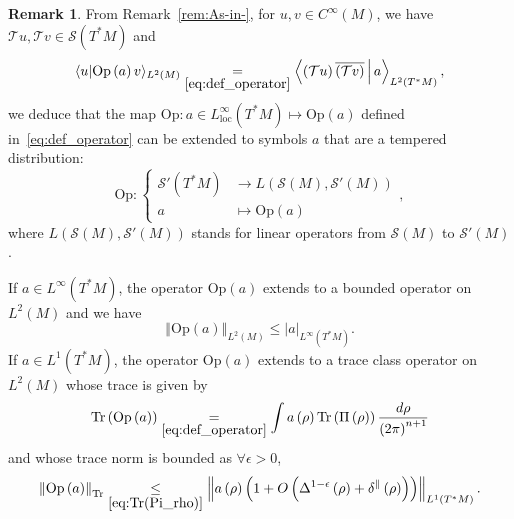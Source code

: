 \documentclass[10pt]{amsart}
\theoremstyle{definition}\newtheorem{defi}[theo]{Definition}\newtheorem{rema}[theo]{Remark}\newtheorem{exam}[theo]{Example}\newtheorem{exem}[theo]{Example}\newtheorem{nota}[theo]{Notation}
\newcommand{\clS}{\mathcal{S}}
\newcommand{\clT}{\mathcal{T}}
\newcommand{\Opp}{\mathrm{Op}}
\newcommand{\Tr}{\mathrm{Tr}}
\newcommand{\locc}{\mathrm{loc}}
\let\oldforall\forall
\renewcommand*{\forall}{\mathrel{\oldforall}}
\begin{document}
\begin{rema}
From Remark~\ref{rem:As-in-}, for $u,v\in C^{\infty}(M)$, we have $\clT u,\clT v\in\clS(T^{*}M)$ and
\[
\langle u|\Opp\left(a\right)v\rangle_{L^{2}\left(M\right)}\underset{\eqref{eq:def_operator}}{=}\left\langle\left(\clT u\right)\overline{\left(\clT v\right)}\,\middle|\,a\right\rangle_{L^{2}\left(T^{*}M\right)},
\]
we deduce that the map $\Opp:a\in L_{\locc}^{\infty}(T^{*}M)\mapsto\Opp(a)$ defined in~\eqref{eq:def_operator} can be extended to symbols $a$ that are a tempered distribution:
\[
\Opp:
\begin{cases}
\clS'\left(T^{*}M\right) & \rightarrow L\left(\clS\left(M\right),\clS'\left(M\right)\right)\\
a & \mapsto\Opp\left(a\right)
\end{cases},
\]
where $L(\clS(M),\clS'(M))$ stands for linear operators from $\clS(M)$ to $\clS'(M)$.
\end{rema}

\begin{cBoxB}{}
\begin{prop}\label{prop:We-havewhere-}
If $a\in L^{\infty}(T^{*}M)$, the operator $\Opp(a)$ extends to a bounded operator on $L^{2}(M)$ and we have
\begin{equation}
\left\Vert \Opp \left(a\right)\right\Vert _{L^{2}\left(M\right)}\underset{}{\leq}\left|a\right|_{L^{\infty}\left(T^{*}M\right)}.\label{eq:norme_symbol}
\end{equation}
If $a\in L^{1}(T^{*}M)$, the operator $\Opp (a)$ extends to a trace class operator on $L^{2}(M)$ whose trace is given by
\begin{equation}
\Tr\left(\Opp \left(a\right)\right)\underset{\eqref{eq:def_operator}}{=}\int a\left(\rho\right)\Tr\left(\Pi\left(\rho\right)\right)\frac{d\rho}{\left(2\pi\right)^{n+1}}\label{eq:Tr_Opa}
\end{equation}
and whose trace norm is bounded as $\forall\epsilon>0$,
\begin{equation}
\left\Vert \Opp \left(a\right)\right\Vert _{\Tr}\underset{\eqref{eq:Tr(Pi_rho)}}{\leq}\left\Vert a\left(\rho\right)\left(1+O\left(\Delta^{1-\epsilon}\left(\rho\right)+\delta^{\parallel}\left(\rho\right)\right)\right)\right\Vert _{L^{1}\left(T^{*}M\right)}.\label{eq:norm_Tr_Op}
\end{equation}
\end{prop}
\end{cBoxB}
\end{document}
